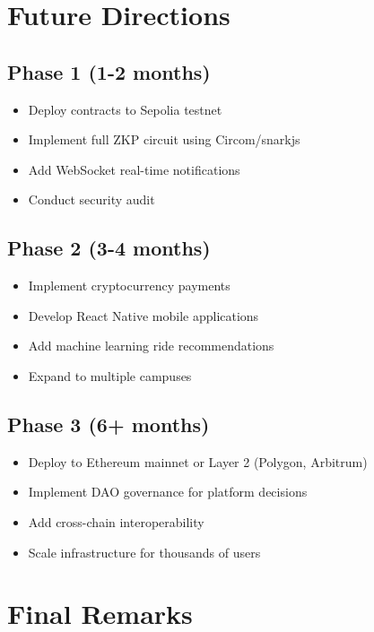 \section{Future Directions}

\subsection{Phase 1 (1-2 months)}

\begin{itemize}
    \item Deploy contracts to Sepolia testnet
    \item Implement full ZKP circuit using Circom/snarkjs
    \item Add WebSocket real-time notifications
    \item Conduct security audit
\end{itemize}

\subsection{Phase 2 (3-4 months)}

\begin{itemize}
    \item Implement cryptocurrency payments
    \item Develop React Native mobile applications
    \item Add machine learning ride recommendations
    \item Expand to multiple campuses
\end{itemize}

\subsection{Phase 3 (6+ months)}

\begin{itemize}
    \item Deploy to Ethereum mainnet or Layer 2 (Polygon, Arbitrum)
    \item Implement DAO governance for platform decisions
    \item Add cross-chain interoperability
    \item Scale infrastructure for thousands of users
\end{itemize}

\section{Final Remarks}

